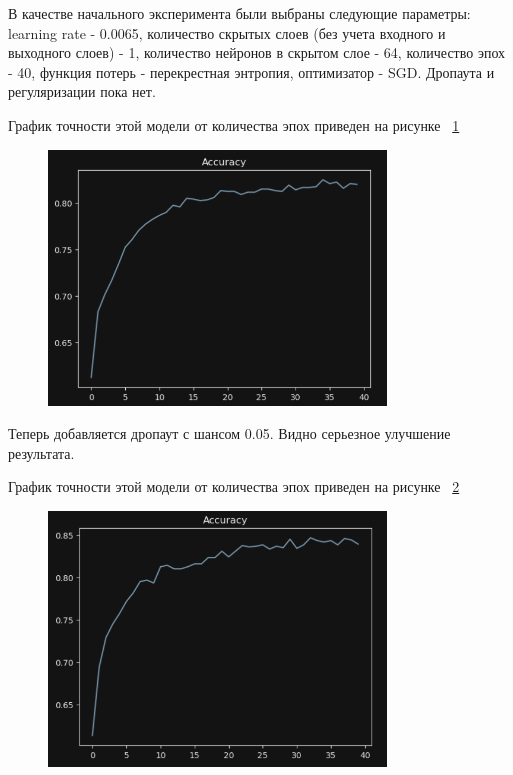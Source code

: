 \documentclass[a4paper, 14pt]{extarticle}
\begin{document}
В качестве начального эксперимента были выбраны следующие параметры: learning rate - 0.0065, количество скрытых слоев (без учета входного и выходного слоев) - 1, количество нейронов в скрытом слое - 64, количество эпох - 40, функция потерь - перекрестная энтропия, оптимизатор - SGD. Дропаута и регуляризации пока нет.

График точности этой модели от количества эпох приведен на рисунке ~\ref{fig:img1}

\begin{figure}[H]
\centering
\includegraphics[width=0.8\textwidth]{images/res1.png}
\caption{}
\label{fig:img1}
\end{figure}

Теперь добавляется дропаут с шансом 0.05. Видно серьезное улучшение результата.

График точности этой модели от количества эпох приведен на рисунке ~\ref{fig:img2}

\begin{figure}[H]
\centering
\includegraphics[width=0.8\textwidth]{images/res2.png}
\caption{}
\label{fig:img2}
\end{figure}
\end{document}
